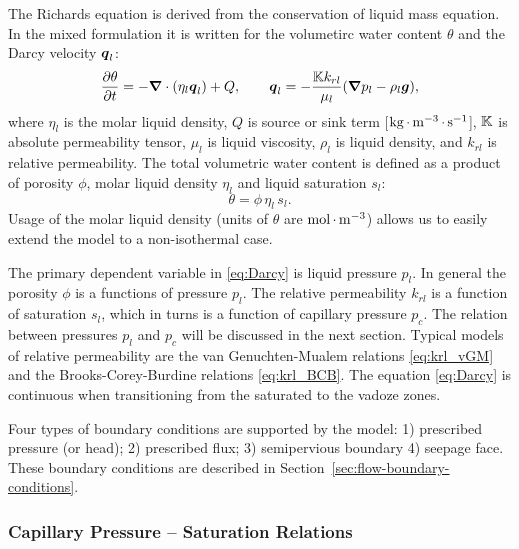 The Richards equation is derived from the conservation of
liquid mass equation.
In the mixed formulation it is written
for the volumetirc water content $\theta$ and the Darcy velocity ${\boldsymbol{q}}_l$:  
\begin{equation}\label{eq:Darcy}
  \frac{\partial \theta}{\partial t} 
  = -{\boldsymbol{\nabla}} \cdot (\eta_l {\boldsymbol{q}}_l) + Q,
  \qquad
  {\boldsymbol{q}}_l = -\frac{{\mathbb K} k_{rl}}{\mu_l} 
  ({\boldsymbol{\nabla}} p_l - \rho_l {\boldsymbol{g}}),
\end{equation}
where 
$\eta_l$ is the molar liquid density,
$Q$ is source or sink term [${\rm kg} {\,\cdot\,} {\rm m}^{-3} {\,\cdot\,} {\rm s}^{-1}$],
${\mathbb K}$ is absolute permeability tensor,
$\mu_l$ is liquid viscosity,
$\rho_l$ is liquid density, and
$k_{rl}$ is relative permeability.
The total volumetric water content is defined as
a product of porosity $\phi$, molar liquid density $\eta_l$ and liquid saturation $s_l$:
$$
  \theta = \phi\, \eta_l\, s_l.
$$
Usage of the molar liquid density (units of $\theta$ are ${\rm mol}{\,\cdot\,}{\rm m}^{-3}$)
allows us to easily extend the model to a non-isothermal case.


The primary dependent variable in \eqref{eq:Darcy} is liquid pressure $p_l$.
In general the porosity $\phi$ is a functions of pressure $p_l$.
The relative permeability $k_{rl}$ is a function of saturation $s_l$,
which in turns is a function of capillary pressure $p_c$. 
The relation between pressures $p_l$ and $p_c$ will be discussed in the next section.
Typical models of relative permeability are 
the van Genuchten-Mualem relations \eqref{eq:krl_vGM} and 
the Brooks-Corey-Burdine relations \eqref{eq:krl_BCB}.
The equation \eqref{eq:Darcy} is continuous when transitioning from the saturated to the vadoze zones.


Four types of boundary conditions are supported by the model:
1) prescribed pressure (or head);
2) prescribed flux;
3) semipervious boundary %
4) seepage face.
These boundary conditions are described in Section~\ref{sec:flow-boundary-conditions}.


\subsubsection{Capillary Pressure -- Saturation Relations}  
\label{sec:richards-pc_s_relations}

